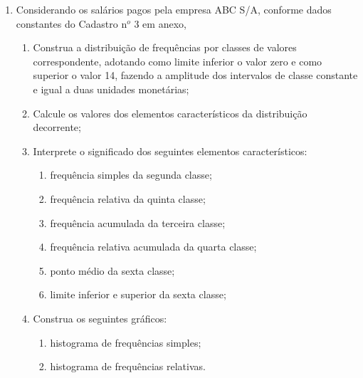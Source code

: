 \begin{enumerate}
\item Considerando os salários pagos pela empresa ABC S/A, conforme dados constantes do Cadastro n$^o$ 3 em anexo, 
	\begin{enumerate}
	\item Construa a distribuição de frequências por classes de valores correspondente, adotando como limite inferior o valor zero e como superior o valor 14, fazendo a amplitude dos intervalos de classe constante e igual a duas unidades monetárias;
	\item Calcule os valores dos elementos característicos da distribuição decorrente;
	\item Interprete o significado dos seguintes elementos característicos:
		\begin{enumerate}
		\item frequência simples da segunda classe;
		\item frequência relativa da quinta classe;
		\item frequência acumulada da terceira classe;
		\item frequência relativa acumulada da quarta classe;
		\item ponto médio da sexta classe;
		\item limite inferior e superior da sexta classe;
		\end{enumerate}
	\item Construa os seguintes gráficos:
		\begin{enumerate}
		\item histograma de frequências simples;
		\item histograma de frequências relativas.
		\end{enumerate}
	\end{enumerate}


\end{enumerate}
